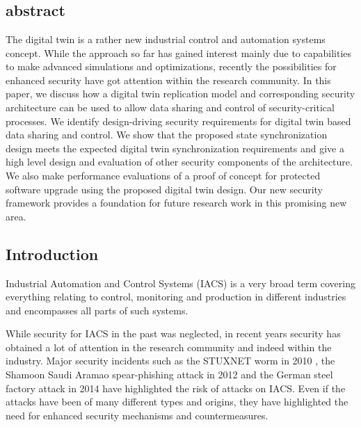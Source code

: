 \chapter[\paperIVtitle]{\texorpdfstring{%
                \paperIVtitle}{%
                \paperIVtitle}}

\label{ch:digital-twin}




\section{abstract}
The digital twin is a rather new industrial control and automation systems concept. While the approach so far has gained interest mainly due to capabilities to make advanced simulations and optimizations, recently the possibilities for enhanced security have got attention within the research community. In this paper, we discuss how a digital twin replication model and corresponding security architecture can be used to allow data sharing and control of security-critical processes. We identify design-driving security requirements for digital twin based data sharing and control. We show that the proposed state synchronization design meets the expected digital twin synchronization requirements and give a high level design and evaluation of other security components of the architecture. We also make performance evaluations of a proof of concept for protected software upgrade using the proposed digital twin design. Our new security framework provides a foundation for future research work in this promising new area.

\section{Introduction}
\label{sec:digital-twin:introduction}

Industrial Automation and Control Systems (IACS) is a very broad term covering everything relating to control, monitoring and production in different industries and encompasses all parts of such systems.

While security for IACS in the past was neglected, in recent years security has obtained a lot of attention in the research community and indeed within the industry. Major security incidents such as the STUXNET worm in 2010 \cite{Falliere2011}, the Shamoon Saudi Aramao spear-phishing attack in 2012 \cite{Leyden2012} and the German steel factory attack in 2014 \cite{Roberts2014} have highlighted the risk of attacks on IACS.  Even if the attacks have been of many different types and origins, they have highlighted the need for enhanced security mechanisms and countermeasures. 

